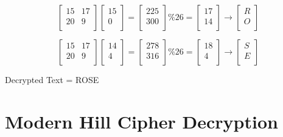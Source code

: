 \documentclass{article}
\begin{document}
\[
    \begin{bmatrix}
   15& 17\\
    20 & 9\\
  \end{bmatrix}
  \begin{bmatrix}
   15\\
    0\\
  \end{bmatrix} =
  \begin{bmatrix}
   225\\
    300\\
  \end{bmatrix} \% 26 = 
   \begin{bmatrix}
   17\\
    14\\
  \end{bmatrix} \rightarrow
   \begin{bmatrix}
   R\\
    O\\
  \end{bmatrix}
  \]
  
\[
    \begin{bmatrix}
   15& 17\\
    20 & 9\\
  \end{bmatrix}
  \begin{bmatrix}
   14\\
    4\\
  \end{bmatrix} =
  \begin{bmatrix}
   278\\
    316\\
  \end{bmatrix} \% 26 = 
   \begin{bmatrix}
   18\\
    4\\
  \end{bmatrix} \rightarrow
   \begin{bmatrix}
   S\\
    E\\
  \end{bmatrix}
  \]


  \begin{center}
      Decrypted Text = ROSE
  \end{center}


\section*{Modern Hill Cipher Decryption}
\end{document}
